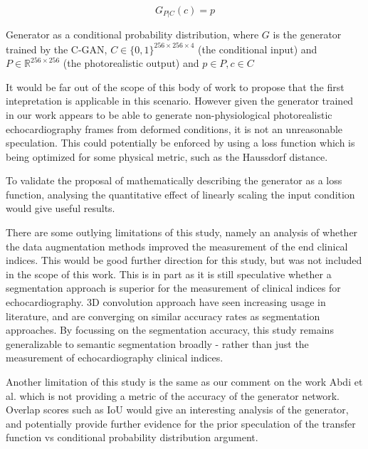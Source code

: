 \begin{equation}
    G_{P|C}(c) = p
\end{equation} \newline

Generator as a conditional probability distribution, where $G$ is the generator
trained by the C-GAN, $C \in \{0,1\}^{256\times256\times4}$ (the conditional
input) and $P \in \mathbb{R}^{256\times256}$ (the photorealistic output) and $p
\in P, c \in C$ \newline

It would be far out of the scope of this body of work to propose that the first
intepretation is applicable in this scenario. However given the generator
trained in our work appears to be able to generate non-physiological
photorealistic echocardiography frames from deformed conditions, it is not an
unreasonable speculation. This could potentially be enforced by using a loss
function which is being optimized for some physical metric, such as the
Haussdorf distance. \newline

To validate the proposal of mathematically describing the generator as a loss
function, analysing the quantitative effect of linearly scaling the input
condition would give useful results. \newline 

There are some outlying limitations of this study, namely an analysis of whether
the data augmentation methods improved the measurement of the end clinical
indices. This would be good further direction for this study, but was not
included in the scope of this work. This is in part as it is still speculative
whether a segmentation approach is superior for the measurement of clinical
indices for echocardiography. 3D convolution approach have seen increasing usage
in literature, and are converging on similar accuracy rates as segmentation
approaches. By focussing on the segmentation accuracy, this study remains
generalizable to semantic segmentation broadly - rather than just the
measurement of echocardiography clinical indices. \newline

Another limitation of this study is the same as our comment on the work Abdi et
al. which is not providing a metric of the accuracy of the generator network.
Overlap scores such as IoU would give an interesting analysis of the generator,
and potentially provide further evidence for the prior speculation of the
transfer function vs conditional probability distribution argument. \newline

